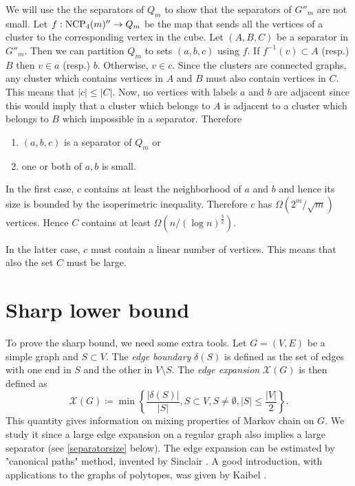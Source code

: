 We will use the the separators of $Q_m$ to show that the separators of $G''_m$ are not small.
Let $f: \textrm{NCP}_4(m)'' \rightarrow Q_m$ 
be the map that sends all the vertices of a cluster to the corresponding vertex 
in the cube. 
Let $(A,B,C)$ be a separator in $G''_m$. Then we can partition
$Q_m$ to sets $(a,b,c)$ using $f$. If $f^{-1}(v) \subset A$ (resp.) $B$ 
then 
$v \in a$ (resp.) $b$. Otherwise, $v \in c$. Since the clusters are connected 
graphs, any cluster which contains vertices in $A$ and $B$ must also contain 
vertices in $C$. This means that $|c| \leq |C|$.
Now, no vertices with labels $a$ and $b$ are adjacent since this would imply 
that a cluster which belongs to $A$ is adjacent to a cluster which belongs to 
$B$ which impossible in a separator. Therefore
\begin{enumerate}
 \item $(a,b,c)$ is a separator of $Q_m$ or
\item one or both of $a,b$ is small.
\end{enumerate}
In the first case, $c$ contains at least the neighborhood of $a$ and $b$ and 
hence its size is bounded by the isoperimetric inequality. Therefore $c$ has 
$\Omega(2^m/\sqrt{m})$ vertices. Hence $C$ contains at least $\Omega(n/(\log 
n)^{\frac{3}{2}})$.

In the latter case, $c$ must contain a linear number of vertices. This means 
that also the set $C$ must be large.  

\section{Sharp lower bound}

To prove the sharp bound, we need some extra tools. Let $G= (V,E)$ be a simple graph and
 $S\subset V$. The \textit{edge boundary} $\delta(S)$ is defined as the set of edges with one end
in $S$ and the other in $V\setminus S$. The \textit{edge expansion} $\mathcal{X}(G)$ is then defined
as 
\begin{equation}
\mathcal{X}(G) \coloneqq  \min \left\{ \frac{ |\delta(S) |}{ |S |}, S \subset V, S\neq \emptyset, |S| \leq \frac{ |V |}{2}  \right\}.
\end{equation} 
This quantity gives information on mixing properties of Markov chain on $G$. We study it since
a large edge expansion on a regular graph also implies a large separator (see \ref{separatorsize} below).
The edge expansion can be estimated by "canonical paths" method, invented by Sinclair \cite{Sinclair}. 
A good introduction, with applications to the graphs of polytopes, was given by Kaibel \cite{Kaibel}. 

